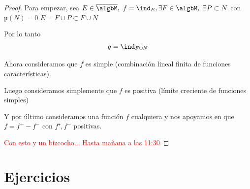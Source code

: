 \documentclass{apuntes}
\begin{document}
\begin{enumerate}
\begin{proof}
Para empezar, sea $E \in \overline{\algbM}, \ f= \ind_E, \exists F \in \algbM, \ \exists P \subset N$ con $µ(N)=0$ $E=F\cup P \subset F \cup N$

Por lo tanto
\[g = \ind_{F \cup N}\]

Ahora consideramos que $f$ es simple (combinación lineal finita de funciones características).

Luego consideramos simplemente que $f$ es positiva (límite creciente de funciones simples)

Y por último consideramos una función $f$ cualquiera y nos apoyamos en que $f= f^+-f^-$ con $f⁺, f^-$ positivas.

\textcolor{red}{Con esto y un bizcocho... Hasta mañana a las 11:30}
\end{proof}
\end{enumerate}



\appendix
\chapter{Ejercicios}




\printindex
\end{document}
